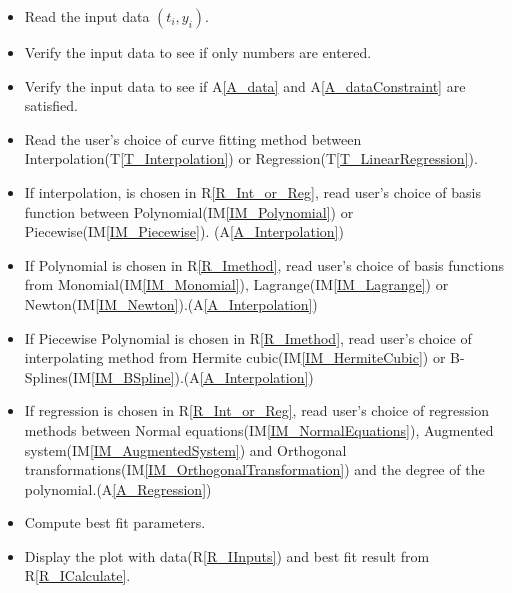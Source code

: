 \documentclass[12pt]{article}
\newcommand{\tref}[1]{T\ref{#1}}
\newcommand{\aref}[1]{A\ref{#1}}
\newcommand{\iref}[1]{IM\ref{#1}}
\newcounter{reqnum} %
\newcommand{\rref}[1]{R\ref{#1}}
\begin{document}
\begin{itemize}
\item[R\refstepcounter{reqnum}\thereqnum \label{R_IInputs}:] Read the input data $(t_i,y_i)$.

\item[R\refstepcounter{reqnum}\thereqnum \label{R_IverifyIPType}:]Verify the input data to see if only numbers are entered.

\item[R\refstepcounter{reqnum}\thereqnum \label{R_IverifyIPData}:]Verify the input data to see if \aref{A_data} and \aref{A_dataConstraint} are satisfied.

\item[R\refstepcounter{reqnum}\thereqnum \label{R_Int_or_Reg}:]Read the user's choice of curve fitting method between Interpolation(\tref{T_Interpolation}) or Regression(\tref{T_LinearRegression}).

\item[R\refstepcounter{reqnum}\thereqnum \label{R_Imethod}:]If interpolation, is chosen in \rref{R_Int_or_Reg}, read user's choice of basis function between Polynomial(\iref{IM_Polynomial}) or Piecewise(\iref{IM_Piecewise}). (\aref{A_Interpolation})

\item[R\refstepcounter{reqnum}\thereqnum \label{R_Polynomialmethod}:]If Polynomial is chosen in \rref{R_Imethod}, read user's choice of basis functions from Monomial(\iref{IM_Monomial}), Lagrange(\iref{IM_Lagrange}) or Newton(\iref{IM_Newton}).(\aref{A_Interpolation})

\item[R\refstepcounter{reqnum}\thereqnum \label{R_Piecewisemethod}:]If Piecewise Polynomial is chosen in \rref{R_Imethod}, read user's choice of interpolating method from Hermite cubic(\iref{IM_HermiteCubic}) or B-Splines(\iref{IM_BSpline}).(\aref{A_Interpolation})

\item[R\refstepcounter{reqnum}\thereqnum \label{R_Rmethod}:]If regression is chosen in \rref{R_Int_or_Reg}, read user's choice of regression methods between Normal equations(\iref{IM_NormalEquations}), Augmented system(\iref{IM_AugmentedSystem}) and Orthogonal transformations(\iref{IM_OrthogonalTransformation}) and the degree of the polynomial.(\aref{A_Regression})

\item[R\refstepcounter{reqnum}\thereqnum \label{R_ICalculate}:] Compute best fit
  parameters. 

\item[R\refstepcounter{reqnum}\thereqnum \label{R_IOutput}:] Display the plot
  with data(\rref{R_IInputs}) and best fit result from
  \rref{R_ICalculate}. 

\end{itemize}
\end{document}
